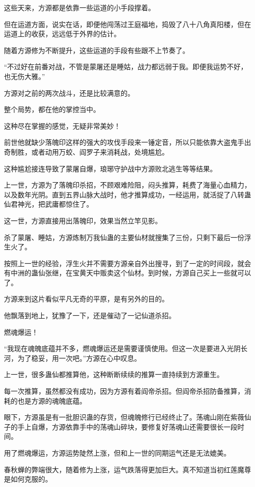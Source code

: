 \begin{this_body}
这些天来，方源都是依靠一些运道的小手段撑着。

但在运道方面，说实在话，即便他闯荡过王庭福地，捣毁了八十八角真阳楼，但在运道上的收获，远远低于外界的估计。

随着方源修为不断提升，这些运道的手段有些跟不上节奏了。

“不过好在前番对战，不管是蒙屠还是睡姑，战力都远弱于我。即便我运势不好，也无伤大雅。”

方源对之前的两次战斗，还是比较满意的。

整个局势，都在他的掌控当中。

这种尽在掌握的感觉，无疑非常美妙！

前世他就缺少落魄印这样的强大的攻伐手段来一锤定音，所以只能依靠大盗鬼手出奇制胜，或者动用万蛟、阎罗子来消耗战，处境尴尬。

这种尴尬接连导致了蒙屠自爆，琅琊守护战中方源败北逃生等等结果。

上一世，方源为了落魄印杀招，不顾艰难险阻，闷头推算，耗费了海量心血精力，以及数年光阴。直到五界山脉大战时，他才推算成功，一经运用，就活捉了八转蛊仙君神光，把武庸都惊住了。

这一世，方源直接用出落魄印，效果当然立竿见影。

杀了蒙屠、睡姑，方源炼制万我仙蛊的主要仙材就搜集了三份，只剩下最后一份浮生火了。

按照上一世的经验，浮生火并不需要方源亲自外出搜寻，到了一定的时间段，就会有中洲的蛊仙张继，在宝黄天中贩卖这个仙材。到时候，方源自己买上一些就可以了。

方源来到这片看似平凡无奇的平原，是有另外的目的。

他飘落到地上，犹豫了一下，还是催动了一记仙道杀招。

燃魂爆运！

“我现在魂魄底蕴并不多，燃魂爆运还是需要谨慎使用。但这一次是要进入光阴长河，为了稳妥，用一次吧。”方源在心中叹息。

上一世，很多蛊仙都推算他，这种断断续续的推算一直持续到方源重生。

每一次推算，虽然都没有成功，因为方源有着阎帝杀招。但阎帝杀招防备推算，消耗的也是方源的魂魄底蕴。

眼下，方源虽是有一批胆识蛊的存货，但魂魄修行已经终止了。荡魂山刚在紫薇仙子的手上自爆，方源依靠手中的荡魂山碎块，要修复好荡魂山还需要很长一段时间。

用了燃魂爆运，方源运势陡然上涨，但和上一世的同期运气还是无法媲美。

春秋蝉的弊端很大，随着修为上涨，运气跌落得更加巨大。真不知道当初红莲魔尊是如何克服的。


\end{this_body}
